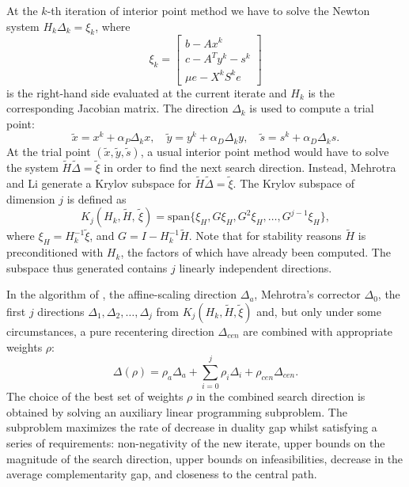 
At the $k$-th iteration of interior point method we have to solve 
the Newton system $H_k \Delta_k = \xi_k$, where 
\[
\xi_k = 
\left[
  \begin{array}{c}
    b - A x^k \\
    c - A^T y^k - s^k \\
    \mu e - X^k S^k e 
  \end{array}
  \right]
\]
is the right-hand side evaluated at the current iterate and $H_k$ 
is the corresponding Jacobian matrix. 
%
The direction $\Delta_k$ is used to compute a trial point:
\[
\tilde{x} = x^k + \alpha_P \Delta_k x, \quad
\tilde{y} = y^k + \alpha_D \Delta_k y, \quad
\tilde{s} = s^k + \alpha_D \Delta_k s.
\]
%
At the trial point $(\tilde x, \tilde y, \tilde s)$, a usual 
interior point method would have to solve the system
$\tilde H \tilde \Delta = \tilde \xi$
in order to find the next search direction. Instead, 
Mehrotra and Li \cite{MehrotraLi} generate a Krylov subspace 
for $\tilde H \tilde \Delta = \tilde \xi$.
The Krylov subspace of dimension $j$ is defined as
\[
K_j (H_k, \tilde H, \, \tilde \xi) =
{\mbox{span}} \{ \xi_H, G \xi_H, G^2 \xi_H, \dots,  G^{j-1} \xi_H \}, 
\]
where $\xi_H = H_k^{-1} \tilde \xi$, and $G = I - H_k^{-1} \tilde H$. 
Note that for stability reasons $\tilde H$ is preconditioned with $H_k$, 
the factors of which have already been computed.
The subspace thus generated contains $j$ linearly independent directions. 

In the algorithm of \cite{MehrotraLi}, the affine-scaling
direction $\Delta_a$, Mehrotra's corrector $\Delta_0$, 
the first $j$ directions $\Delta_1, \Delta_2, \dots, \Delta_j$ 
from $K_j (H_k, \tilde H, \tilde \xi)$ and, but only under some 
circumstances, a pure recentering direction $\Delta_{cen}$ are 
combined with appropriate weights $\rho$:
\[
\Delta(\rho) = \rho_a\Delta_a + \sum_{i=0}^j \rho_i \Delta_i 
             + \rho_{cen}\Delta_{cen}.
\]
The choice of the best set of weights $\rho$ in the combined search 
direction is obtained by solving an auxiliary linear programming 
subproblem. The subproblem maximizes the rate of decrease 
in duality gap whilst satisfying a series of requirements:
non-negativity of the new iterate,
upper bounds on the magnitude of the search direction,
upper bounds on infeasibilities,
decrease in the average complementarity gap,
and closeness to the central path.

